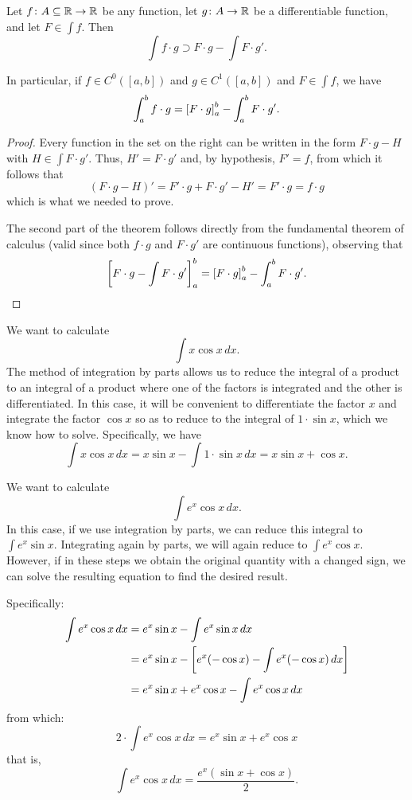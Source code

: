 \begin{theorem}
\mymark{*}%
%
%
Let $f\colon A\subseteq {\mathbb R} \to {\mathbb R}$ be any function, let $g\colon A \to{\mathbb R}$ be a
differentiable function, and let $F \in \int f$. Then
\[
  \int f\cdot g \supset F \cdot g - \int F \cdot g'.
\]

In particular, if $f\in C^0([a,b])$ and $g\in C^1([a,b])$ and $F \in \int f$, we
have
\[
  \int_a^b f\cdot g = {\left[ F\cdot g \right]}_a^b - \int_a^b F \cdot g'.
\]
\end{theorem}
%
\begin{proof}
\mymark{*}
Every function in the set on the right can be written in the form $F\cdot g - H$
with $H \in \int F \cdot g'$. Thus, $H' = F \cdot g'$ and, by hypothesis,
$F'=f$, from which it follows that
\[
(F\cdot g - H)' = F' \cdot g + F \cdot g' - H' = F' \cdot g
= f\cdot g
\]
which is what we needed to prove.

The second part of the theorem follows directly from the fundamental theorem of
calculus (valid since both $f\cdot g$ and $F \cdot g'$ are continuous
functions), observing that
\[
{\left[ F\cdot g - \int F \cdot g' \right]}_a^b
= {\left[ F\cdot g \right]}_a^b - \int_a^b F \cdot g'.
\]
\end{proof}

\begin{example}
We want to calculate
\[
  \int x \cos x\, dx.
\]
The method of integration by parts allows us to reduce the integral of a product
to an integral of a product where one of the factors is integrated and the other
is differentiated. In this case, it will be convenient to differentiate the
factor $x$ and integrate the factor $\cos x$ so as to reduce to the integral of
$1\cdot \sin x$, which we know how to solve. Specifically, we have
\[
 \int x \cos x\, dx = x \sin x - \int 1 \cdot \sin x \, dx
  = x \sin x + \cos x.
\]
\end{example}

\begin{example}
  \label{ex:822309}
We want to calculate
\[
 \int e^x \cos x\, dx.
\]
In this case, if we use integration by parts, we can reduce this integral to
$\int e^x \sin x$. Integrating again by parts, we will again reduce to $\int e^x
\cos x$. However, if in these steps we obtain the original quantity with a
changed sign, we can solve the resulting equation to find the desired result.

Specifically:
\begin{align*}
\int e^x \cos x\, dx
&= e^x \sin x - \int e^x \sin x\, dx\\
 &= e^x \sin x - {\left[ e^x(-\cos x) - \int e^x(-\cos x)\, dx \right]} \\
 &= e^x \sin x + e^x \cos x - \int e^x \cos x \, dx
\end{align*}
from which:
\[
 2 \cdot \int e^x \cos x\, dx  = e^x \sin x + e^x \cos x
\]
that is,
\[
  \int e^x \cos x\, dx = \frac{e^x(\sin x + \cos x)}{2}.
\]
\end{example}

